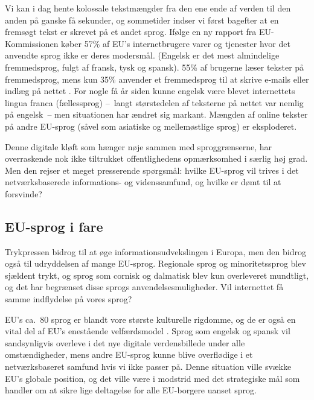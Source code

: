 \begin{multicols}{2}
Vi kan i dag hente kolossale tekstm\ae ngder fra den ene ende af verden til den anden \mbox{p\aa} ganske \mbox{f\aa} sekunder, og sommetider indser vi f\o rst bagefter at en frems\o gt tekst er skrevet \mbox{p\aa} et andet sprog. If\o lge en ny rapport fra EU-Kommissionen k\o ber 57\% af EU's internetbrugere varer og tjenester hvor det anvendte sprog ikke er deres modersm\aa l. (Engelsk er det mest almindelige fremmedsprog, fulgt af fransk, tysk og spansk). 55\% af brugerne l\ae ser tekster \mbox{p\aa} fremmedsprog, mens kun 35\% anvender et fremmedsprog til at skrive e-mails eller indl\ae g \mbox{p\aa} nettet \cite{EC1}.  For nogle \mbox{f\aa} \aa r siden kunne engelsk v\ae re blevet internettets lingua franca (f\ae llessprog) --~langt st\o rstedelen af teksterne \mbox{p\aa} nettet var nemlig \mbox{p\aa} engelsk~--  men situationen har \ae ndret sig markant. M\ae ngden af online tekster \mbox{p\aa} andre EU-sprog (s\aa vel som asiatiske og mellem\o stlige sprog) er eksploderet.

Denne digitale kl\o ft som h\ae nger n\o je sammen med sproggr\ae nserne, har overraskende nok ikke tiltrukket offentlighedens opm\ae rksomhed i s\ae rlig h\o j grad. Men den rejser et meget presserende sp\o rgsm\aa l: hvilke EU-sprog vil trives i det netv\ae rksbaserede informations- og videnssamfund, og hvilke er d\o mt til at forsvinde?
  

\subsection{EU-sprog i fare}

 Trykpressen bidrog til at \o ge informationsudvekslingen i Europa, men den bidrog \mbox{ogs\aa} til udryddelsen af mange EU-sprog. Regionale sprog og minoritetssprog blev sj\ae ldent trykt, og sprog som cornisk og dalmatisk blev kun overleveret mundtligt, og det har begr\ae nset disse sprogs anvendelsesmuligheder. Vil internettet \mbox{f\aa} samme indflydelse \mbox{p\aa} vores sprog?


EU's ca.\ 80 sprog er blandt vore st\o rste kulturelle rigdomme, og de er \mbox{ogs\aa} en vital del af EU's enest\aa ende velf\ae rdsmodel \cite{EC2}.  Sprog som engelsk og spansk vil sandsynligvis overleve i det nye digitale verdensbillede under alle omst\ae ndigheder, mens andre EU-sprog kunne blive overfl\o dige i et netv\ae rksbaseret samfund hvis vi ikke passer \mbox{p\aa}. Denne situation ville sv\ae kke EU's globale position, og det ville v\ae re i modstrid med det strategiske m\aa l som handler om at sikre lige deltagelse for alle EU-borgere uanset sprog.


\end{multicols}
